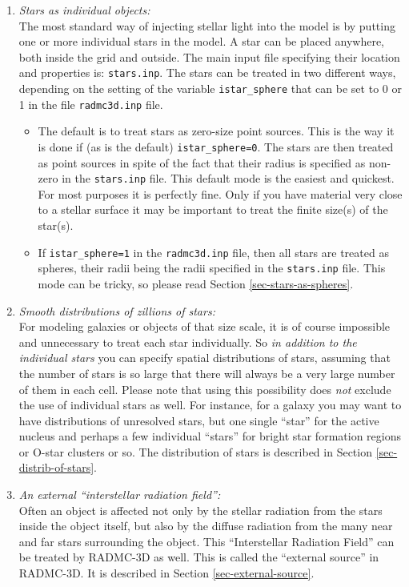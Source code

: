 \documentclass{report}
\begin{document}
\begin{enumerate}
\item {\em Stars as individual objects:}\\
  The most standard way of injecting stellar light into the model is by
  putting one or more individual stars in the model. A star can be placed
  anywhere, both inside the grid and outside. The main input file specifying
  their location and properties is: {\small\tt stars.inp}. The stars can 
  be treated in two different ways, depending on the setting of the 
  variable {\small\tt istar\_sphere} that can be set to 0 or 1 in the
  file {\small\tt radmc3d.inp} file. 
  \begin{itemize}
    \item The default is to treat stars as zero-size point sources. This is
      the way it is done if (as is the default) {\small\tt istar\_sphere=0}.
      The stars are then treated as point sources in spite of the fact that
      their radius is specified as non-zero in the {\small\tt stars.inp} file.
      This default mode is the easiest and quickest. For most purposes it is
      perfectly fine. Only if you have material very close to a stellar surface
      it may be important to treat the finite size(s) of the star(s).
    \item If {\small\tt istar\_sphere=1} in the {\small\tt radmc3d.inp} file,
      then all stars are treated as spheres, their radii being the radii
      specified in the {\small\tt stars.inp} file. This mode can be tricky,
      so please read Section \ref{sec-stars-as-spheres}.
  \end{itemize}
\item {\em Smooth distributions of zillions of stars:}\\
  For modeling galaxies or objects of that size scale, it is of course
  impossible and unnecessary to treat each star individually. So {\em in
    addition to the individual stars} you can specify spatial distributions
  of stars, assuming that the number of stars is so large that there will
  always be a very large number of them in each cell. Please note that using
  this possibility does {\em not} exclude the use of individual stars as
  well. For instance, for a galaxy you may want to have distributions of
  unresolved stars, but one single ``star'' for the active nucleus and
  perhaps a few individual ``stars'' for bright star formation regions or
  O-star clusters or so. The distribution of stars is described in 
  Section \ref{sec-distrib-of-stars}.
\item {\em An external ``interstellar radiation field'':}\\
  Often an object is affected not only by the stellar radiation from the
  stars inside the object itself, but also by the diffuse radiation from the
  many near and far stars surrounding the object. This ``Interstellar
  Radiation Field'' can be treated by RADMC-3D as well. This is called the
  ``external source'' in RADMC-3D. It is described in Section
  \ref{sec-external-source}.
\end{enumerate}
\end{document}
